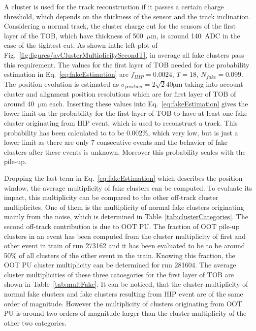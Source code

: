 A cluster is used for the track reconstruction if it passes a certain charge threshold, which depends on the thickness of the sensor and the track inclination. Considering a normal track, the cluster charge cut for the sensors of the first layer of the TOB, which have thickness of 500~$\mu$m, is around 140~ADC in the case of the tightest cut. As shown inthe left plot of Fig.~\ref{fig:figures/avClusterMultiplicitySecondT}, in average all fake clusters pass this requirement. The values for the first layer of TOB needed for the probability estimation in Eq.~\ref{eq:fakeEstimation} are $f_{HIP} = 0.0024$, $T = 18$, $N_{fake} =0.099$. The position evolution is estimated as $\sigma_{position} = 2 \sqrt{2} 40 \mathrm{\mu m}$ taking into account cluster and alignment position resolutions which are for first layer of TOB of around 40~$\mathrm{\mu m}$ each. Inserting these values into Eq.~\ref{eq:fakeEstimation} gives the lower limit on the probability for the first layer of TOB to have at least one fake cluster originating from HIP event,  which is used to reconstruct a track. This probability has been calculated to to be $0.002\%$, which very low, but is just a lower limit as there are only 7 consecutive events and the behavior of fake clusters after these events is unknown. Moreover this probability scales with the pile-up. %

Dropping the last term  in Eq.~\ref{eq:fakeEstimation} which describes the position window, the average multiplicity of fake clusters can be computed. To evaluate its impact, this multiplicity can be compared to the other off-track cluster multiplicites. One of them is the multiplicity of normal fake clusters originating mainly from the noise, which is determined in Table~\ref{tab:clusterCategories}. The second off-track contribution is due to OOT PU. The fraction of OOT pile-up clusters in an event has been computed from the cluster multiplicity of first and other event in train of run 273162 and it has been evaluated to be to be around 50\% of all clusters of the other event in the train. Knowing this fraction, the OOT PU cluster multiplicity can be determined for run 281604. The average cluster multiplicities of these three catoegories for the first layer of TOB are shown in Table~\ref{tab:multFake}. It can be noticed, that the cluster multiplicity of normal fake clusters and fake clusters resulting from HIP event are of the same order of magnitude. However the multiplicity of clusters originating from OOT PU is around two orders of magnitude larger than the cluster multiplicity of the other two categories.  



